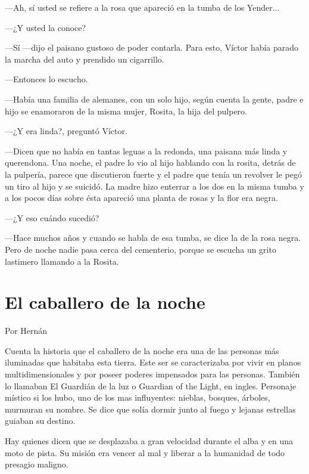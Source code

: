 \documentclass[11pt,twoside,openright,a5paper]{book}
\begin{document}
---Ah, sí usted se refiere a la rosa que apareció en la tumba de los Yender...

---¿Y usted la conoce?

---Sí ---dijo el paisano gustoso de poder contarla. Para esto, Víctor había parado la marcha del auto y prendido un cigarrillo.

---Entonces lo escucho.

---Había una familia de alemanes, con un solo hijo, según cuenta la  gente, padre e hijo se enamoraron de la misma mujer, Rosita, la hija del pulpero.

---¿Y era linda?, preguntó Víctor.

---Dicen que no había en tantas leguas a la redonda, una paisana más linda y querendona. Una noche, el padre lo vio al hijo hablando con la rosita, detrás de la pulpería, parece que discutieron fuerte y el padre que tenía un revolver le pegó un tiro al hijo y se suicidó. La madre hizo enterrar a los dos en la misma tumba y a los pocos días sobre ésta apareció una planta de rosas y la flor era negra.

---¿Y eso cuándo sucedió?

---Hace muchos años y cuando se habla de esa tumba, se dice la de la rosa negra. Pero de noche nadie pasa cerca del cementerio, porque se escucha un grito lastimero llamando a la Rosita.


\section*{El caballero de la noche}

                                                                               \begin{flushright}Por Hernán\end{flushright}

Cuenta la historia que el caballero de la noche era una de las personas más iluminadas que habitaba esta tierra. Este ser se caracterizaba por vivir en planos multidimensionales y por poseer poderes impensados para las personas. También  lo llamaban El Guardián de la luz o Guardian of the Light, en ingles. Personaje místico si los hubo, uno de los mas influyentes: nieblas, bosques, árboles, murmuran su nombre. Se dice que solía dormir junto al fuego y lejanas estrellas guiaban su destino.

Hay quienes dicen que se desplazaba a gran velocidad durante el alba y en una moto de pista.  Su misión era vencer al mal y liberar a la humanidad de todo presagio maligno. 
\end{document}
